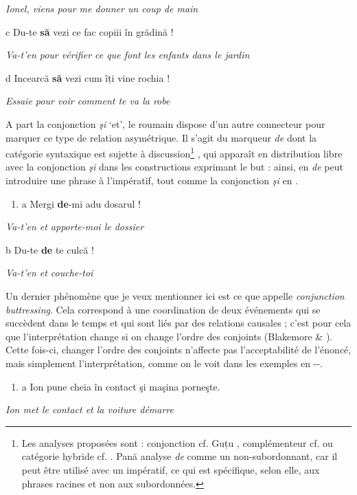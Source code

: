 {\itshape
Ionel, viens pour me donner un coup de main}

  c  Du-te \textbf{să} vezi ce fac copiii în grădină !

{\itshape
Va-t'en pour vérifier ce que font les enfants dans le jardin}

  d  Incearcă \textbf{să} vezi cum îți vine rochia !

{\itshape
Essaie pour voir comment te va la robe}

A part la conjonction \textit{şi} `et', le roumain dispose d'un autre connecteur pour marquer ce type de relation asymétrique. Il s'agit du marqueur \textit{de} dont la catégorie syntaxique est sujette à discussion\footnote{Les analyses proposées sont : conjonction cf. Guțu \citet{Romalo1973}, complémenteur cf. \citet{Avram2001} ou catégorie hybride cf. \citet{Niculescu1965}. Pană \citet[202]{Dindelegan2003} analyse \textit{de} comme un non-subordonnant, car il peut être utilisé avec un impératif, ce qui est spécifique, selon elle, aux phrases racines et non aux subordonnées.} , qui apparaît en distribution libre avec la conjonction \textit{şi} dans les constructions exprimant le but : ainsi, en  \textit{de} peut introduire une phrase à l'impératif, tout comme la conjonction \textit{şi} en .\textit{~}


\begin{enumerate}
\item \label{bkm:Ref300786403}a  Mergi \textbf{de}-mi adu dosarul !


\end{enumerate}
{\itshape
Va-t'en et apporte-moi le dossier}

  b  Du-te \textbf{de} te culcă !

    \textit{Va-t'en et couche-toi}

Un dernier phénomène que je veux mentionner ici est ce que \citet{Levinson2000} appelle \textit{conjunction buttressing}. Cela correspond à une coordination de deux événements qui se succèdent dans le temps et qui sont liés par des relations causales ; c'est pour cela que l'interprétation change si on change l'ordre des conjoints (Blakemore \& \citet{Carston2005}). Cette fois-ci, changer l'ordre des conjoints n'affecte pas l'acceptabilité de l'énoncé, mais simplement l'interprétation, comme on le voit dans les exemples en --.  


\begin{enumerate}
\item \label{bkm:Ref300786844}a  Ion pune cheia în contact şi maşina porneşte.


\end{enumerate}
{\itshape
Ion met le contact et la voiture démarre}

